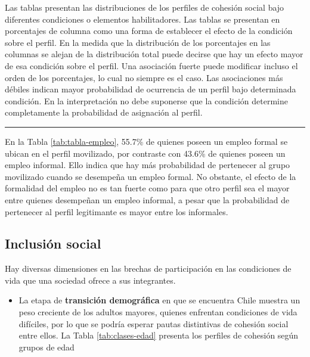 \documentclass[
  12pt,
]{book}
\providecommand{\tightlist}{%
  \setlength{\itemsep}{0pt}\setlength{\parskip}{0pt}}
\begin{document}
Las tablas presentan las distribuciones de los perfiles de cohesión social bajo diferentes condiciones o elementos habilitadores. Las tablas se presentan en porcentajes de columna como una forma de establecer el efecto de la condición sobre el perfil. En la medida que la distribución de los porcentajes en las columnas se alejan de la distribución total puede decirse que hay un efecto mayor de esa condición sobre el perfil. Una asociación fuerte puede modificar incluso el orden de los porcentajes, lo cual no siempre es el caso. Las asociaciones más débiles indican mayor probabilidad de ocurrencia de un perfil bajo determinada condición. En la interpretación no debe suponerse que la condición determine completamente la probabilidad de asignación al perfil.

\begin{center}\rule{0.5\linewidth}{0.5pt}\end{center}

En la Tabla \ref{tab:tabla-empleo}, 55.7\% de quienes poseen un empleo formal se ubican en el perfil movilizado, por contraste con 43.6\% de quienes poseen un empleo informal. Ello indica que hay más probabilidad de pertenecer al grupo movilizado cuando se desempeña un empleo formal. No obstante, el efecto de la formalidad del empleo no es tan fuerte como para que otro perfil sea el mayor entre quienes desempeñan un empleo informal, a pesar que la probabilidad de pertenecer al perfil legitimante es mayor entre los informales.

\hypertarget{inclusiuxf3n-social}{%
\subsection{Inclusión social}\label{inclusiuxf3n-social}}

Hay diversas dimensiones en las brechas de participación en las condiciones de vida que una sociedad ofrece a sus integrantes.

\begin{itemize}
\tightlist
\item
  La etapa de \textbf{transición demográfica} en que se encuentra Chile muestra un peso creciente de los adultos mayores, quienes enfrentan condiciones de vida difíciles, por lo que se podría esperar pautas distintivas de cohesión social entre ellos. La Tabla \ref{tab:clases-edad} presenta los perfiles de cohesión según grupos de edad
\end{itemize}
\end{document}
